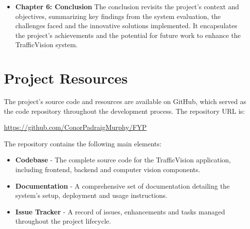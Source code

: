 \begin{itemize}
    \item \textbf{Chapter 6: Conclusion} The conclusion revisits the project's context and objectives, summarizing key findings from the system evaluation, the challenges faced and the innovative solutions implemented. It encapsulates the project’s achievements and the potential for future work to enhance the TrafficVision system.

\end{itemize}

\section{Project Resources}

The project's source code and resources are available on GitHub, which served as the code repository throughout the development process. The repository URL is:

\begin{center}
\url{https://github.com/ConorPadraigMurphy/FYP}
\end{center}

The repository contains the following main elements:

\begin{itemize}
    \item \textbf{Codebase} - The complete source code for the TrafficVision application, including frontend, backend and computer vision components.
    \item \textbf{Documentation} - A comprehensive set of documentation detailing the system's setup, deployment and usage instructions.
    \item \textbf{Issue Tracker} - A record of issues, enhancements and tasks managed throughout the project lifecycle.
\end{itemize}